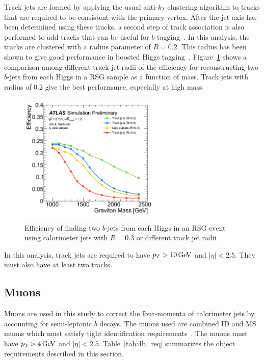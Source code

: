 Track jets are formed by applying the usual anti-$k_{T}$ clustering algorithm to tracks that are required to be consistent with the primary vertex. After the jet axis has been determined using these tracks, a second step of track association is also performed to add tracks that can be useful for $b$-tagging~\cite{TrackJets}. In this analysis, the tracks are clustered with a radius parameter of $R = 0.2$. This radius has been shown to give good performance in boosted Higgs tagging~\cite{TrackJets,BoostedHiggs}. Figure~\ref{fig:rcomp} shows a comparison among different track jet radii of the efficiency for reconstructing two $b$-jets from each Higgs in a RSG sample as a function of mass. Track jets with radius of $0.2$ give the best performance, especially at high mass. 

\begin{figure}[h!]
  \centering
  \captionsetup{justification=centering}

  \includegraphics[width=0.6\textwidth]{figures/TrackJet_RComp}
  \caption{Efficiency of finding two $b$-jets from each Higgs in an RSG event using calorimeter jets with $R=0.3$ or different track jet radii~\cite{TrackJets}}
  \label{fig:rcomp}
\end{figure}

In this analysis, track jets are required to have $p_{T} > 10 \GeV$ and $|\eta| < 2.5$. They must also have at least two tracks. 

\subsection{Muons}

Muons are used in this study to correct the four-momenta of calorimeter jets by accounting for semi-leptonic $b$ decays. The muons used are combined ID and MS muons which must satisfy tight identification requirements~\cite{MuonReco}. The muons must have $\pT > 4 \GeV$ and $|\eta| < 2.5$. Table~\ref{tab:4b_req} summarizes the object requirements described in this section.

